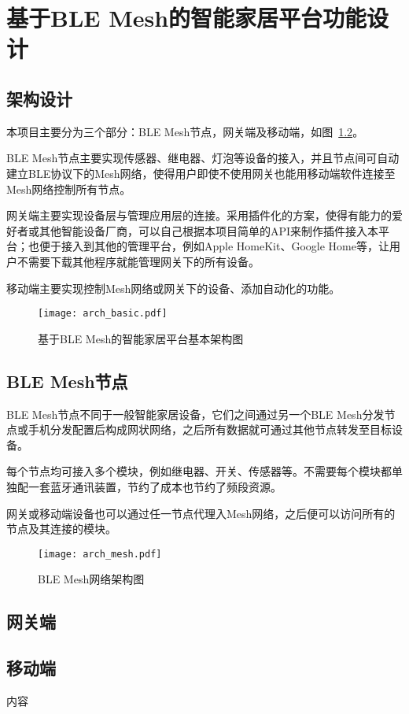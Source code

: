 \chapter{基于BLE Mesh的智能家居平台功能设计}

\section{架构设计}
本项目主要分为三个部分：BLE Mesh节点，网关端及移动端，如图~\ref{fig:arch}。

BLE Mesh节点主要实现传感器、继电器、灯泡等设备的接入，并且节点间可自动建立BLE协议下的Mesh网络，使得用户即使不使用网关也能用移动端软件连接至Mesh网络控制所有节点。

网关端主要实现设备层与管理应用层的连接。采用插件化的方案，使得有能力的爱好者或其他智能设备厂商，可以自己根据本项目简单的API来制作插件接入本平台；也便于接入到其他的管理平台，例如Apple HomeKit、Google Home等，让用户不需要下载其他程序就能管理网关下的所有设备。

移动端主要实现控制Mesh网络或网关下的设备、添加自动化的功能。
\begin{figure}[H]
    \centering
    \texttt{[image: arch\_basic.pdf]}
    \caption{基于BLE Mesh的智能家居平台基本架构图}
    \label{fig:arch}
\end{figure}

\section{BLE Mesh节点}
BLE Mesh节点不同于一般智能家居设备，它们之间通过另一个BLE Mesh分发节点或手机分发配置后构成网状网络，之后所有数据就可通过其他节点转发至目标设备。

每个节点均可接入多个模块，例如继电器、开关、传感器等。不需要每个模块都单独配一套蓝牙通讯装置，节约了成本也节约了频段资源。

网关或移动端设备也可以通过任一节点代理入Mesh网络，之后便可以访问所有的节点及其连接的模块。
\begin{figure}[H]
    \centering
    \texttt{[image: arch\_mesh.pdf]}
    \caption{BLE Mesh网络架构图}
    \label{fig:arch}
\end{figure}
\section{网关端}


\section{移动端}
内容
